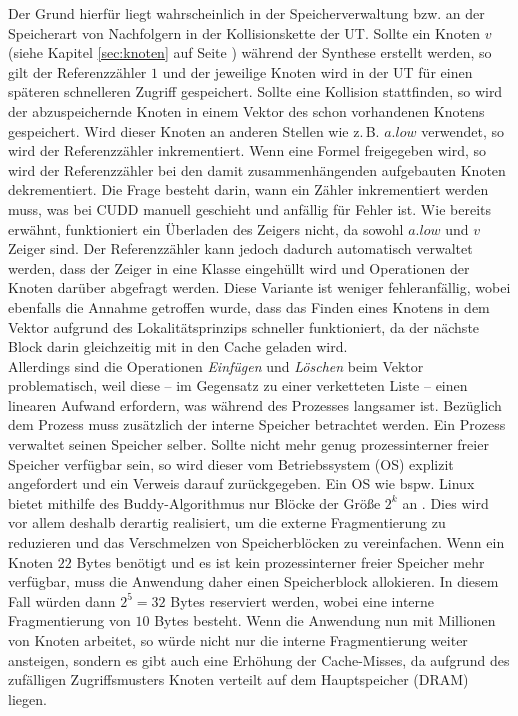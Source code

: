 Der Grund hierfür liegt wahrscheinlich in der Speicherverwaltung bzw. an der Speicherart von Nachfolgern in der Kollisionskette der UT. Sollte ein Knoten $v$ (siehe Kapitel \ref{sec:knoten} auf Seite \pageref{sec:knoten}) während der Synthese erstellt werden, so gilt der Referenzzähler $1$ und der jeweilige Knoten wird in der UT für einen späteren schnelleren Zugriff gespeichert. Sollte eine Kollision stattfinden, so wird der abzuspeichernde Knoten in einem Vektor des schon vorhandenen Knotens gespeichert. Wird dieser Knoten an anderen Stellen wie z.\,B. $a.low$ verwendet, so wird der Referenzzähler inkrementiert. Wenn eine Formel freigegeben wird, so wird der Referenzzähler bei den damit zusammenhängenden aufgebauten Knoten dekrementiert. Die Frage besteht darin, wann ein Zähler inkrementiert werden muss, was bei CUDD manuell geschieht und anfällig für Fehler ist. Wie bereits erwähnt, funktioniert ein Überladen des Zeigers nicht, da sowohl $a.low$ und $v$ Zeiger sind. Der Referenzzähler kann jedoch dadurch automatisch verwaltet werden, dass der Zeiger in eine Klasse eingehüllt wird und Operationen der Knoten darüber abgefragt werden. Diese Variante ist weniger fehleranfällig, wobei ebenfalls die Annahme getroffen wurde, dass das Finden eines Knotens in dem Vektor aufgrund des Lokalitätsprinzips schneller funktioniert, da der nächste Block darin gleichzeitig mit in den Cache geladen wird.\\
Allerdings sind die Operationen \textit{Einfügen} und \textit{Löschen} beim Vektor problematisch, weil diese -- im Gegensatz zu einer verketteten Liste -- einen linearen Aufwand erfordern, was während des Prozesses langsamer ist. Bezüglich dem Prozess muss zusätzlich der interne Speicher betrachtet werden. Ein Prozess verwaltet seinen Speicher selber. Sollte  nicht mehr genug prozessinterner freier Speicher verfügbar sein, so wird dieser vom Betriebssystem (OS) explizit angefordert und ein Verweis darauf zurückgegeben. Ein OS wie bspw. Linux bietet mithilfe des Buddy-Algorithmus nur Blöcke der Größe $2^k$ an \cite{s2008}. Dies wird vor allem deshalb derartig realisiert, um die externe Fragmentierung zu reduzieren und das Verschmelzen von Speicherblöcken zu vereinfachen. Wenn ein Knoten $22$ Bytes benötigt und es ist kein prozessinterner freier Speicher mehr verfügbar, muss die Anwendung daher einen Speicherblock allokieren. In diesem Fall würden dann $2^5=32$ Bytes reserviert werden, wobei eine interne Fragmentierung von $10$ Bytes besteht. Wenn die Anwendung nun mit Millionen von Knoten arbeitet, so würde nicht nur die interne Fragmentierung weiter ansteigen, sondern es gibt auch eine Erhöhung der Cache-Misses, da aufgrund des zufälligen Zugriffsmusters Knoten verteilt auf dem Hauptspeicher (DRAM) liegen.